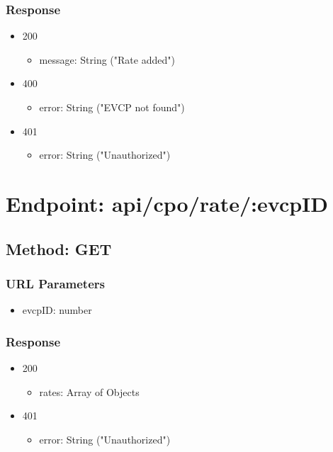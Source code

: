 \subsubsection*{Response}
\begin{itemize}
    \item 200
          \begin{itemize}
              \item message: String ("Rate added")
          \end{itemize}
    \item 400
          \begin{itemize}
              \item error: String ("EVCP not found")
          \end{itemize}
    \item 401
          \begin{itemize}
              \item error: String ("Unauthorized")
          \end{itemize}
\end{itemize}

\section*{Endpoint: api/cpo/rate/:evcpID}
\subsection*{Method: GET}
\subsubsection*{URL Parameters}
\begin{itemize}
    \item evcpID: number
\end{itemize}
\subsubsection*{Response}
\begin{itemize}
    \item 200
          \begin{itemize}
              \item rates: Array of Objects
          \end{itemize}
    \item 401
          \begin{itemize}
              \item error: String ("Unauthorized")
          \end{itemize}
\end{itemize}

